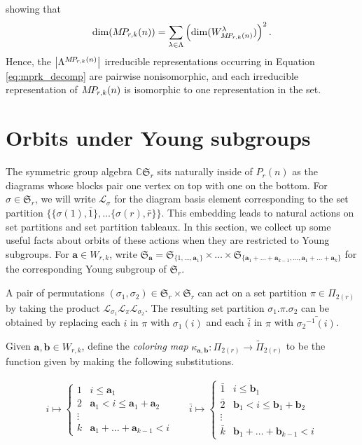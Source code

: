 \documentclass[10pt]{amsart}
\theoremstyle{definition}
\theoremstyle{definition}
\theoremstyle{plain}
\theoremstyle{remark}
\theoremstyle{plain}
\theoremstyle{plain}
\newcommand{\C}{\mathbb{C}}
\newcommand{\LL}{\mathcal{L}}
\newcommand{\SG}{\mathfrak{S}}
\newcommand{\bfa}{{\boldsymbol{a}}}
\newcommand{\bfb}{{\boldsymbol{b}}}
\newcommand{\MP}{{\rm M\!P\!}}
\newcommand{\ov}[1]{\bar{#1}}
\newcommand{\abs}[1]{\left| #1\right |}
\newcommand{\defn}[1]{\textcolor{defncolor}{\emph{#1}}}
\begin{document}
showing that \begin{align*}
    \dim(\MP_{r,k}(n))=\sum_{\lambda\in\Lambda}\left(\dim(W_{\MP_{r,k}(n)}^\lambda)\right)^2.
\end{align*} Hence, the $\abs{\Lambda^{\MP_{r,k}(n)}}$ irreducible representations occurring in Equation \ref{eq:mprk_decomp} are pairwise nonisomorphic, and each irreducible representation of $\MP_{r,k}(n)$ is isomorphic to one representation in the set.

\section{Orbits under Young subgroups}\label{sec:orbits}

The symmetric group algebra $\C\SG_r$ sits naturally inside of $P_r(n)$ as the diagrams whose blocks pair one vertex on top with one on the bottom. For $\sigma\in\SG_r$, we will write $\LL_\sigma$ for the diagram basis element corresponding to the set partition $\{\{\sigma(1),\ov1\},\dots\{\sigma(r),\ov{r}\}\}$. This embedding leads to natural actions on set partitions and set partition tableaux. In this section, we collect up some useful facts about orbits of these actions when they are restricted to Young subgroups. For $\bfa\in W_{r,k}$, write $\SG_\bfa=\SG_{\{1,\dots,\bfa_1\}}\times\dots\times\SG_{\{\bfa_1+\dots+\bfa_{k-1},\dots,\bfa_1+\dots+\bfa_k\}}$ for the corresponding Young subgroup of $\SG_r$.

A pair of permutations $(\sigma_1,\sigma_2)\in \SG_r\times\SG_r$ can act on a set partition $\pi\in\Pi_{2(r)}$ by taking the product $\LL_{\sigma_1}\LL_{\pi}\LL_{\sigma_2}$. The resulting set partition $\sigma_1.\pi.\sigma_2$ can be obtained by replacing each $i$ in $\pi$ with $\sigma_1(i)$ and each $\ov{i}$ in $\pi$ with $\ov{{\sigma_2}^{-1}(i)}$.

Given $\bfa,\bfb\in W_{r,k}$, define the \defn{coloring map} $\kappa_{\bfa,\bfb}:\Pi_{2(r)}\to\tilde\Pi_{2(r)}$ to be the function given by making the following substitutions.

\begin{align*}
    i \mapsto \begin{cases}
        1 & i\leq \bfa_1\\
        2 & \bfa_1<i\leq \bfa_1+\bfa_2\\
        \vdots\\
        k & \bfa_1+\dots+\bfa_{k-1}<i
    \end{cases} && \ov i \mapsto \begin{cases}
        \ov1 & i\leq \bfb_1\\
        \ov2 & \bfb_1<i\leq \bfb_1+\bfb_2\\
        \vdots\\
        \ov k & \bfb_1+\dots+\bfb_{k-1}<i
    \end{cases}
\end{align*}
\end{document}
